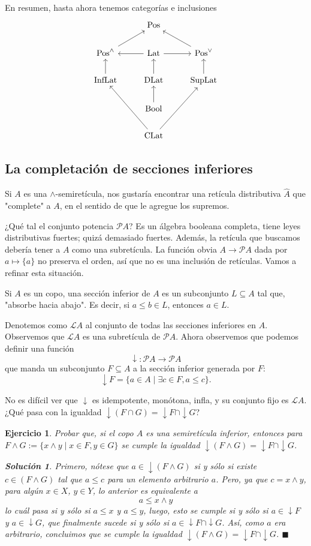 \documentclass[12pt,letterpaper,titlepage]{article}
\newcommand{\xqed}[1]{%
  \leavevmode\unskip\penalty9999 \hbox{}\nobreak\hfill
  \quad\hbox{\ensuremath{#1}}}
\newtheorem{exe}{Ejercicio}
\theoremstyle{definition}
\newtheorem*{soltemp}{Solución}
\newenvironment{sol}[1]{%
    \begin{soltemp}#1}{%
    \xqed{\blacksquare}\end{soltemp}%
}
\newcommand\down{{\downarrow}}
\renewcommand\inf{\wedge}
\renewcommand\cal[1]{\mathcal{#1}}
\newcommand\<{\langle}
\renewcommand\>{\rangle}
\newcommand{\Pos}{\mathrm{Pos}}
\newcommand{\Lat}{\mathrm{Lat}}
\newcommand{\SupLat}{\mathrm{SupLat}}
\newcommand{\InfLat}{\mathrm{InfLat}}
\newcommand{\CLat}{\mathrm{CLat}}
\newcommand{\DLat}{\mathrm{DLat}}
\newcommand{\Bool}{\mathrm{Bool}}
\begin{document}
En resumen, hasta ahora tenemos categorías e inclusiones
\[
    \begin{tikzcd}
        & & \Pos & & \\
        & \Pos^\wedge \arrow[ru]
        & \Lat \arrow[l] \arrow[r]  
        & \Pos^\vee \arrow[lu] & \\
        & \InfLat \arrow[u]
            & \DLat \arrow[u] &
            \SupLat \arrow[u] & \\
        & & \Bool \arrow[u] & \\
        & & \CLat \arrow[ruu]
        \arrow[luu] & &
    \end{tikzcd}
\]

\subsection{La completación de secciones inferiores}
Si $A$ es una $\inf$-semiretícula, nos gustaría encontrar una
retícula distributiva $\hat A$ que "complete" a $A$, en el
sentido de que le agregue los supremos.

¿Qué tal el conjunto potencia $\cal PA$?
Es un álgebra booleana completa, tiene leyes distributivas
fuertes; quizá demasiado fuertes.
Además, la retícula que buscamos debería tener a $A$ como una
subretícula.
La función obvia $A\to\cal PA$ dada por $a\mapsto\{a\}$
no preserva el orden, así que no es una inclusión de
retículas.
Vamos a refinar esta situación.

Si $A$ es un copo, una sección inferior de $A$
es un subconjunto $L\subseteq A$ tal que, "absorbe hacia abajo".
Es decir, si $a\leq b\in L$, entonces $a\in L$.

Denotemos como $\cal LA$ al conjunto de todas las secciones
inferiores en $A$.
Observemos que $\cal LA$ es una subretícula
de $\cal PA$.
Ahora observemos que podemos definir una función
\[
  \down:\cal PA\to\cal PA
\]
que manda un subconjunto $F\subseteq A$ a la sección inferior
generada por $F$:
\[
  \down F = \{a\in A \mid \exists c\in F , a\leq c\}
.\]

No es difícil ver que $\down$ es idempotente, monótona, infla,
y su conjunto fijo es $\cal LA$.
¿Qué pasa con la igualdad $\down(F\cap G)=\down F\cap\down G$?
\begin{exe}%
  Probar que, si el copo $A$ es una semiretícula inferior,
  entonces para $F\inf G := \{x\inf y \mid x\in F, y\in G\}$ se cumple la igualdad $\down(F\inf G)= \down F\cap\down G $.
  \begin{sol}
      Primero, nótese que $a\in \down(F\wedge G)$ si y sólo si existe $c\in (F\wedge G)$ tal que $a\leq c$ para un elemento arbitrario $a$. Pero, ya que $c=x\wedge y$, para algún $x\in X$, $y\in Y$, lo anterior es equivalente a $$a\leq x \wedge y$$ lo cuál pasa si y sólo si $a\leq x$ y $a\leq y$, luego, esto se cumple si y sólo si $a\in\downarrow F$ y $a\in\downarrow G$, que finalmente sucede si y sólo si $a\in \downarrow F \cap \downarrow G$.
      Así, como $a$ era arbitrario, concluimos que se cumple la igualdad $\downarrow(F\wedge G) = \downarrow F \cap \downarrow G$.
  \end{sol}
\end{exe}
\end{document}
